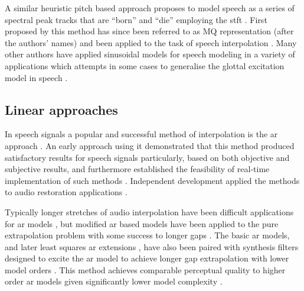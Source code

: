 A similar heuristic pitch based approach proposes to model speech as a series of spectral peak tracks that are ``born'' and ``die'' employing the \gls{stft} \cite{Maher1994}. First proposed by \cite{McAulay1986} this method has since been referred to as MQ representation (after the authors' names) and been applied to the task of speech interpolation \cite{Maher1994}. Many other authors have applied sinusoidal models for speech modeling in a variety of applications \cite{Godsill1998book}\cite{Vera-Candeas2003}\cite{Wells2006} which attempts in some cases to generalise the glottal excitation model in speech \cite{McAulay1986}.


\subsection{Linear approaches}\label{sec:LitRev_RestorationLin}

In speech signals a popular and successful method of interpolation is the \gls{ar} approach \cite{Vaseghi1988thesis}\cite{Godsill1998book}\cite{Kauppinen2002b}. An early approach using it demonstrated that this method produced satisfactory results for speech signals particularly, based on both objective and subjective results, and furthermore established the feasibility of real-time implementation of such methods \cite{Janssen1986}. Independent development applied the methods to audio restoration applications \cite{Vaseghi1988thesis}\cite{Vaseghi1990}.

Typically longer stretches of audio interpolation have been difficult applications for \gls{ar} models \cite{Veldhuis1992}\cite{Kauppinen2002b}, but modified \gls{ar} based models have been applied to the pure extrapolation problem with some success to longer gaps \cite{Kauppinen2002b}. The basic \gls{ar} models, and later least squares \gls{ar} extensions \cite{Godsill1998book}, have also been paired with synthesis filters designed to excite the \gls{ar} model to achieve longer gap extrapolation with lower model orders \cite{Esquef2006}. This method achieves comparable perceptual quality to higher order \gls{ar} models given significantly lower model complexity \cite{Esquef2006}.

